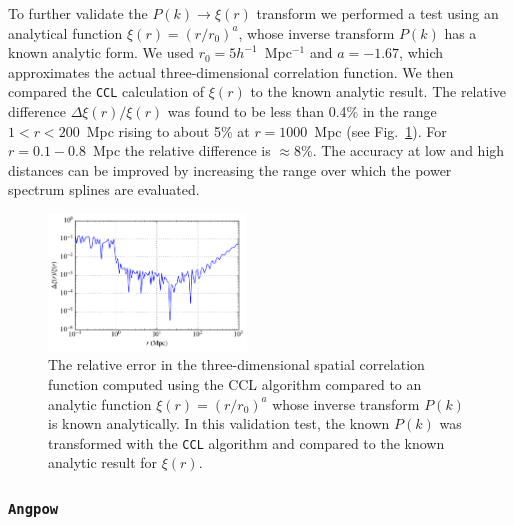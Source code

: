 \documentclass[\docopts]{\docclass}
\newcommand{\ccl}{{\tt CCL}\xspace}
\begin{document}
To further validate the $P(k) \to \xi(r)$ transform we performed a test using an analytical function $\xi(r) = (r / r_0)^a$, whose inverse transform $P(k)$ 
has a known analytic form. We used $r_0 = 5 h^{-1}$~Mpc$^{-1}$ and $a = -1.67$, which approximates the actual three-dimensional correlation function.   
We then compared the \ccl calculation of $\xi(r)$ to the known analytic result. The relative difference $\Delta \xi(r) / \xi(r)$ was found to be   
less than 0.4\% in the range $1 < r < 200$~Mpc rising to about 5\% at $r = 1000$~Mpc (see Fig.~\ref{fig:analytic_xi}). For $r=0.1-0.8$~Mpc the relative difference is $\approx$8\%. The accuracy at low and high distances can be improved by increasing the range over which the power spectrum splines are evaluated.
%
\begin{figure}[htbp]
\centering
\includegraphics[width=0.47\textwidth]{analytic_xi}
\caption{The relative error in the three-dimensional spatial correlation function computed using the CCL algorithm compared to an analytic function $\xi(r) = (r/r_0)^a$ whose inverse transform $P(k)$ is known analytically. In this validation test, the known $P(k)$ was transformed with the \ccl algorithm and compared to the known analytic result for $\xi(r)$.}
\label{fig:analytic_xi}
\end{figure}

\subsubsection{\tt Angpow}
\end{document}
